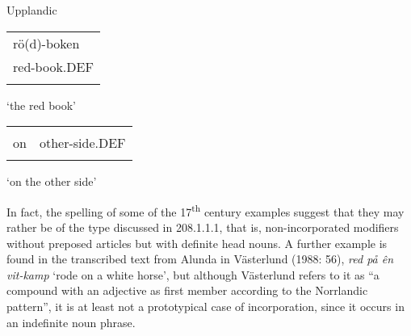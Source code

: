 
\begin{listWWNumileveli}
\item {}

\begin{styleExample}
Upplandic

\end{styleExample}

\end{listWWNumileveli}

\begin{listWWNumlxvileveli}
\item {}

\end{listWWNumlxvileveli}

\begin{tabular}{l}
\lsptoprule
rö(d)-boken\\
red-book.DEF\\
\lspbottomrule
\end{tabular}

\begin{styleTranslation}
‘the red book’

\end{styleTranslation}

\begin{tabular}{ll}
\lsptoprule
\multicolumn{2}{l}{på

}\\
on & other-side.DEF\\
\lspbottomrule
\end{tabular}

\begin{styleTranslation}
 ‘on the other side’

\end{styleTranslation}

\begin{styleBodyTextFirst}
In fact, the spelling of some of the 17\textsuperscript{th} century examples suggest that they may rather be of the type discussed in 208.1.1.1, that is, non-incorporated modifiers without preposed articles but with definite head nouns. A further example is found in the transcribed text from Alunda in Västerlund (1988: 56), \textit{red på ên vi{\textasciigrave}t-kamp} ‘rode on a white horse’, but although Västerlund refers to it as “a compound with an adjective as first member according to the Norrlandic pattern”, it is at least not a prototypical case of incorporation, since it occurs in an indefinite noun phrase.

\end{styleBodyTextFirst}

